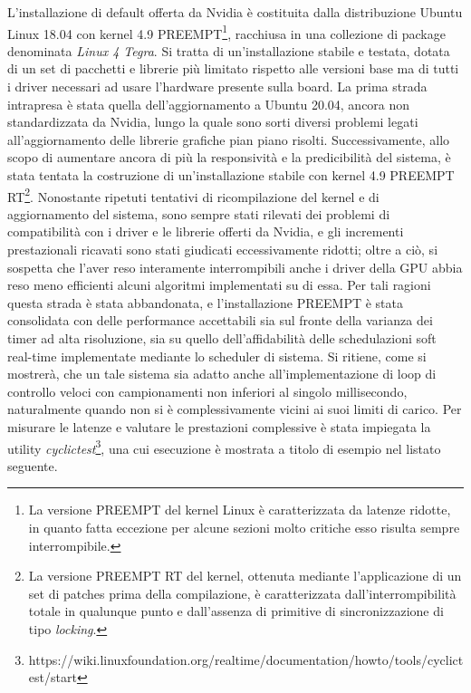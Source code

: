 L'installazione di default offerta da Nvidia è costituita dalla distribuzione Ubuntu Linux 18.04 con kernel 4.9 PREEMPT\footnote{La versione PREEMPT del kernel Linux è caratterizzata da latenze ridotte, in quanto fatta eccezione per alcune sezioni molto critiche esso risulta sempre interrompibile.}, racchiusa in una collezione di package denominata \emph{Linux 4 Tegra}. Si tratta di un'installazione stabile e testata, dotata di un set di pacchetti e librerie più limitato rispetto alle versioni base ma di tutti i driver necessari ad usare l'hardware presente sulla board. La prima strada intrapresa è stata quella dell'aggiornamento a Ubuntu 20.04, ancora non standardizzata da Nvidia, lungo la quale sono sorti diversi problemi legati all'aggiornamento delle librerie grafiche pian piano risolti. Successivamente, allo scopo di aumentare ancora di più la responsività e la predicibilità del sistema, è stata tentata la costruzione di un'installazione stabile con kernel 4.9 PREEMPT RT\footnote{La versione PREEMPT RT del kernel, ottenuta mediante l'applicazione di un set di patches prima della compilazione, è caratterizzata dall'interrompibilità totale in qualunque punto e dall'assenza di primitive di sincronizzazione di tipo \emph{locking}.}. Nonostante ripetuti tentativi di ricompilazione del kernel e di aggiornamento del sistema, sono sempre stati rilevati dei problemi di compatibilità con i driver e le librerie offerti da Nvidia, e gli incrementi prestazionali ricavati sono stati giudicati eccessivamente ridotti; oltre a ciò, si sospetta che l'aver reso interamente interrompibili anche i driver della GPU abbia reso meno efficienti alcuni algoritmi implementati su di essa. Per tali ragioni questa strada è stata abbandonata, e l'installazione PREEMPT è stata consolidata con delle performance accettabili sia sul fronte della varianza dei timer ad alta risoluzione, sia su quello dell'affidabilità delle schedulazioni soft real-time implementate mediante lo scheduler di sistema. Si ritiene, come si mostrerà, che un tale sistema sia adatto anche all'implementazione di loop di controllo veloci con campionamenti non inferiori al singolo millisecondo, naturalmente quando non si è complessivamente vicini ai suoi limiti di carico. Per misurare le latenze e valutare le prestazioni complessive è stata impiegata la utility \emph{cyclictest}\footnote{https://wiki.linuxfoundation.org/realtime/documentation/howto/tools/cyclictest/start}, una cui esecuzione è mostrata a titolo di esempio nel listato seguente.\vfill\newpage

